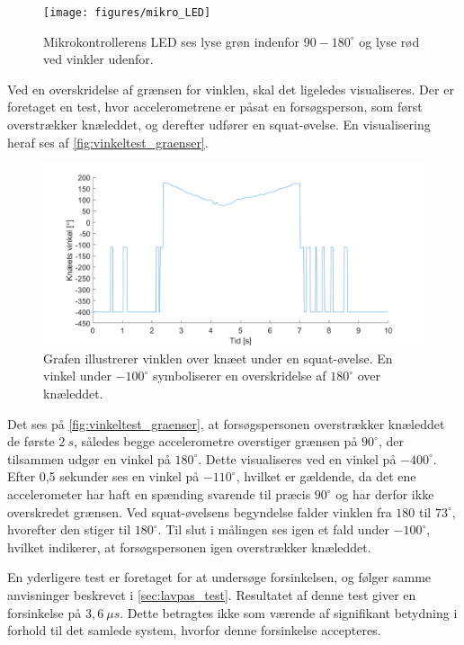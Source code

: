 \begin{figure}[H]
\centering
\texttt{[image: figures/mikro\_LED]}
\caption{Mikrokontrollerens LED ses lyse grøn indenfor $90-180^{\circ}$ og lyse rød ved vinkler udenfor.}
\label{fig:mikro_LED}
\end{figure}

\noindent
Ved en overskridelse af grænsen for vinklen, skal det ligeledes visualiseres. 
Der er foretaget en test, hvor accelerometrene er påsat en forsøgsperson, som først overstrækker knæleddet, og derefter udfører en squat-øvelse. 
En visualisering heraf ses af \autoref{fig:vinkeltest_graenser}.

\begin{figure}[H]
\centering
\includegraphics[width=1\textwidth]{figures/vinkeltest_graenser}
\caption{Grafen illustrerer vinklen over knæet under en squat-øvelse. En vinkel under $-100^{\circ}$ symboliserer en overskridelse af $180^{\circ}$ over knæleddet.}
\label{fig:vinkeltest_graenser}
\end{figure}

\noindent
Det ses på \autoref{fig:vinkeltest_graenser}, at forsøgspersonen overstrækker knæleddet de første $2~s$, således begge accelerometre overstiger grænsen på $90^{\circ}$, der tilsammen udgør en vinkel på $180^{\circ}$. 
Dette visualiseres ved en vinkel på $-400^{\circ}$. 
Efter 0,5 sekunder ses en vinkel på $-110^{\circ}$, hvilket er gældende, da det ene accelerometer har haft en spænding svarende til præcis $90^{\circ}$ og har derfor ikke overskredet grænsen. 
Ved squat-øvelsens begyndelse falder vinklen fra $180$ til $73^{\circ}$, hvorefter den stiger til $180^{\circ}$. 
Til slut i målingen ses igen et fald under $-100^{\circ}$, hvilket indikerer, at forsøgspersonen igen overstrækker knæleddet.

\noindent
En yderligere test er foretaget for at undersøge forsinkelsen, og følger samme anvisninger beskrevet i \autoref{sec:lavpas_test}.  
Resultatet af denne test giver en forsinkelse på  $3,6~\mu s$. Dette betragtes ikke som værende af signifikant betydning i forhold til det samlede system, hvorfor denne forsinkelse accepteres.

